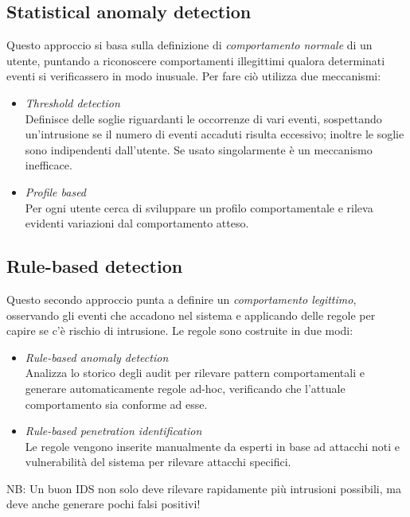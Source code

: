 \documentclass[a4paper, 11pt, notitlepage, fleqn]{report}
\begin{document}
\subsection{Statistical anomaly detection}
Questo approccio si basa sulla definizione di \emph{comportamento normale} di un utente, puntando a riconoscere comportamenti illegittimi qualora determinati eventi si verificassero in modo inusuale.
Per fare ciò utilizza due meccanismi:
\begin{itemize}
	\item \emph{Threshold detection}\\
	Definisce delle soglie riguardanti le occorrenze di vari eventi, sospettando un'intrusione se il numero di eventi accaduti risulta eccessivo; inoltre le soglie sono indipendenti dall'utente. Se usato singolarmente è un meccanismo inefficace.
	\item \emph{Profile based}\\
	Per ogni utente cerca di sviluppare un profilo comportamentale e rileva evidenti variazioni dal comportamento atteso.
\end{itemize}

\subsection{Rule-based detection}
Questo secondo approccio punta a definire un \emph{comportamento legittimo}, osservando gli eventi che accadono nel sistema e applicando delle regole per capire se c'è rischio di intrusione. Le regole sono costruite in due modi:
\begin{itemize}
	\item \emph{Rule-based anomaly detection}\\
	Analizza lo storico degli audit per rilevare pattern comportamentali e generare automaticamente regole ad-hoc, verificando che l'attuale comportamento sia conforme ad esse.
	\item \emph{Rule-based penetration identification}\\
	Le regole vengono inserite manualmente da esperti in base ad attacchi noti e vulnerabilità del sistema per rilevare attacchi specifici.
\end{itemize}

\noindent
NB: Un buon IDS non solo deve rilevare rapidamente più intrusioni possibili, ma deve anche generare pochi falsi positivi! 
\end{document}
